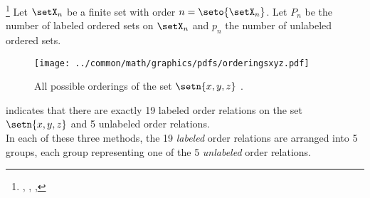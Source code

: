 \begin{proposition}
\footnote{
  ,
  ,
  ,
  }
\label{prop:num_posets}
Let $\setX_n$ be a finite set with order $n=\seto{\setX_n}$.
Let $P_n$ be the number of labeled ordered sets on $\setX_n$
and $p_n$ the number of unlabeled  ordered sets.
\end{proposition}


\begin{figure}[th]
\begin{center}
%
\texttt{[image: ../common/math/graphics/pdfs/orderingsxyz.pdf]}%
%
\end{center}
\caption{
  All possible orderings of the set $\setn{x,y,z}$ .
  \label{fig:num_posets_xyz}
  }
\end{figure}

\begin{example}  %
\label{ex:num_posets_xyz}
 indicates that there are exactly
19 labeled order relations on the set $\setn{x,y,z}$ and 5 unlabeled order relations.
\\
In each of these three methods, the 19 \emph{labeled} order relations are arranged into 5 groups,
each group representing one of the 5 \emph{unlabeled} order relations.
\end{example}

